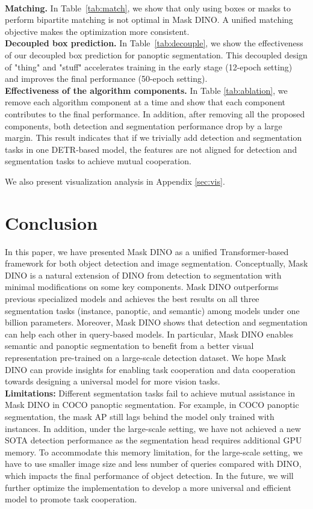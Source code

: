 \documentclass[10pt,twocolumn,letterpaper]{article}
\begin{document}
\\\textbf{Matching.}
In Table~\ref{tab:match}, we show that only using boxes or masks to perform bipartite matching is not optimal in Mask DINO. A unified matching objective makes the optimization more consistent.
\\\textbf{Decoupled box prediction.}
In Table~\ref{tab:decouple}, we show the effectiveness of our decoupled box prediction for panoptic segmentation. This decoupled design of "thing" and "stuff" accelerates training in the early stage (12-epoch setting) and improves the final performance (50-epoch setting).
\\\textbf{Effectiveness of the algorithm components.} In Table \ref{tab:ablation}, we remove each algorithm component at a time and show that each component contributes to the final performance. 
In addition, after removing all the proposed components, both detection and segmentation performance drop by a large margin. This result indicates that if we trivially add detection and segmentation tasks in one DETR-based model, the features are not aligned for detection and segmentation tasks to achieve mutual cooperation.


We also present visualization analysis in Appendix \ref{sec:vis}.


\section{Conclusion}
In this paper, we have presented Mask DINO as a unified Transformer-based framework for both object detection and image segmentation. Conceptually, Mask DINO is a natural extension of DINO from detection to segmentation with minimal modifications on some key components.
Mask DINO outperforms previous specialized models and achieves the best results on all three segmentation tasks (instance, panoptic, and semantic) among models under one billion parameters. {Moreover, Mask DINO shows that detection and segmentation can help each other in query-based models.} In particular, Mask DINO enables semantic and panoptic segmentation to benefit from a better visual representation pre-trained on a large-scale detection dataset. We hope Mask DINO can provide insights for enabling task cooperation and data cooperation towards designing a universal model for more vision tasks.
\\\textbf{Limitations: }Different segmentation tasks fail to achieve mutual assistance in Mask DINO in COCO panoptic segmentation. 
For example, in COCO panoptic segmentation, the mask AP still lags behind the model only trained with instances. 
In addition, under the large-scale setting, we have not achieved a new SOTA detection performance as the segmentation head requires additional GPU memory. To accommodate this memory limitation, for the large-scale setting, we have to use smaller image size and less number of queries compared with DINO, which impacts the final performance of object detection. In the future, we will further optimize the implementation to develop a more universal and efficient model to promote task cooperation.
\end{document}
